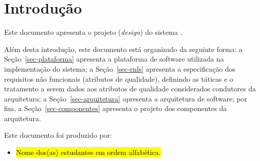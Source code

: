 \chapter{Introdução}
\label{sec-intro}
\vspace{-1cm}

Este documento apresenta o projeto (\textit{design}) do sistema \emph{\imprimirtitulo}. 


Além desta introdução, este documento está organizado da seguinte forma: 
	a Seção~\ref{sec-plataforma} apresenta a plataforma de software utilizada na implementação do sistema;
	a Seção~\ref{sec-rnfs} apresenta a especificação dos requisitos não funcionais (atributos de qualidade), definindo as táticas e o tratamento a serem dados aos atributos de qualidade considerados condutores da arquitetura; 
	a Seção~\ref{sec-arquitetura} apresenta a arquitetura de software; por fim, 
	a Seção~\ref{sec-componentes} apresenta o projeto dos componentes da arquitetura.
	

Este documento foi produzido por:
\begin{itemize}
	\item \hl{Nome dos(as) estudantes em ordem alfabética.}
\end{itemize}

